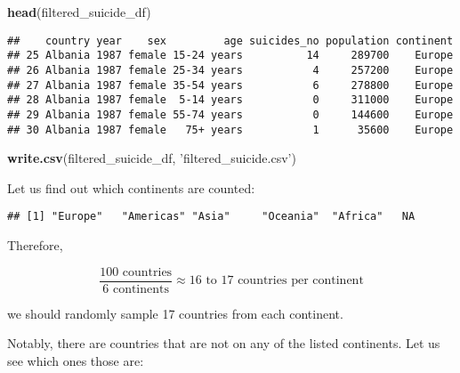 \documentclass[]{article}
\newenvironment{Shaded}{\begin{snugshade}}{\end{snugshade}}
\newcommand{\CommentTok}[1]{\textcolor[rgb]{0.56,0.35,0.01}{\textit{#1}}}
\newcommand{\KeywordTok}[1]{\textcolor[rgb]{0.13,0.29,0.53}{\textbf{#1}}}
\newcommand{\NormalTok}[1]{#1}
\newcommand{\OperatorTok}[1]{\textcolor[rgb]{0.81,0.36,0.00}{\textbf{#1}}}
\newcommand{\StringTok}[1]{\textcolor[rgb]{0.31,0.60,0.02}{#1}}
\begin{document}
\begin{Shaded}
\begin{Highlighting}[]
\KeywordTok{head}\NormalTok{(filtered_suicide_df)}
\end{Highlighting}
\end{Shaded}

\begin{verbatim}
##    country year    sex         age suicides_no population continent
## 25 Albania 1987 female 15-24 years          14     289700    Europe
## 26 Albania 1987 female 25-34 years           4     257200    Europe
## 27 Albania 1987 female 35-54 years           6     278800    Europe
## 28 Albania 1987 female  5-14 years           0     311000    Europe
## 29 Albania 1987 female 55-74 years           0     144600    Europe
## 30 Albania 1987 female   75+ years           1      35600    Europe
\end{verbatim}

\begin{Shaded}
\begin{Highlighting}[]
\KeywordTok{write.csv}\NormalTok{(filtered_suicide_df, }\StringTok{'filtered_suicide.csv'}\NormalTok{)}
\end{Highlighting}
\end{Shaded}

Let us find out which continents are counted:

\begin{Shaded}
\end{Shaded}

\begin{verbatim}
## [1] "Europe"   "Americas" "Asia"     "Oceania"  "Africa"   NA
\end{verbatim}

Therefore,

\[
    \frac{100 \textrm{ countries}}{6 \textrm{ continents}} \approx 16 \textrm{ to } 17 \textrm{ countries per continent}
\]

we should randomly sample 17 countries from each continent.

Notably, there are countries that are not on any of the listed
continents. Let us see which ones those are:

\begin{Shaded}
\end{Shaded}
\end{document}
